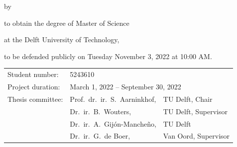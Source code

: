 \begin{titlepage}


    \begin{center}

        
        {\makeatletter
            \largetitlestyle\fontsize{64}{94}\selectfont\@title
            \makeatother}
        
        {\makeatletter
            \ifx\@subtitle\undefined\else
                \bigskip
                {\tudsffamily\fontsize{22}{32}\selectfont\@subtitle}
            \fi
            \makeatother}
        
        \bigskip
        \bigskip
        
        by
        
        \bigskip
        \bigskip
        
        {\makeatletter
            \largetitlestyle\fontsize{26}{26}\selectfont\@author
            \makeatother}
        
        \bigskip
        \bigskip
        
        to obtain the degree of Master of Science
        
        at the Delft University of Technology,
        
        to be defended publicly on Tuesday November 3, 2022 at 10:00 AM.
        
        \vfill
        \begin{tabular}{lll}
            Student number:   & 5243610                                                                          \\
            Project duration: & \multicolumn{2}{l}{March 1, 2022 -- September 30, 2022}                          \\
            Thesis committee: & Prof.\ dr.\ ir.\ S.\ Aarninkhof,                        & TU Delft, Chair        \\
                              & Dr.\ ir.\ B.\ Wouters,                                       & TU Delft, Supervisor   \\
                              & Dr.\ ir.\ A.\ Gijón-Mancheño,                                & TU Delft               \\
                              & Dr.\ ir.\ G.\ de Boer,                                       & Van Oord, Supervisor 
        \end{tabular}
        

\end{center}
\end{titlepage}
